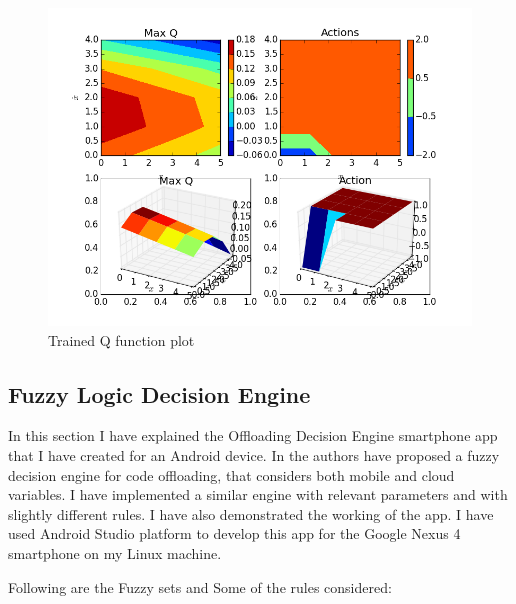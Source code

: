 \documentclass{article}
\begin{document}
\begin{figure}[h]
  \centering
  \includegraphics[width=5in]{reinforcement.png}
  \caption{Trained Q function plot}
  \label{fig:offload2}
\end{figure}

\subsection{Fuzzy Logic Decision Engine}
In this section I have explained the Offloading Decision Engine smartphone app that I have created for an Android device.   
In \cite{flores2013adaptive} the authors have proposed a fuzzy decision engine for code offloading, that considers both mobile and cloud variables. I have implemented a similar engine with relevant parameters and with slightly different rules. 
I have also demonstrated the working of the app. I have used Android Studio platform to develop this app for the Google Nexus 4 smartphone on my Linux machine.

Following are the Fuzzy sets and Some of the rules considered:
\end{document}
